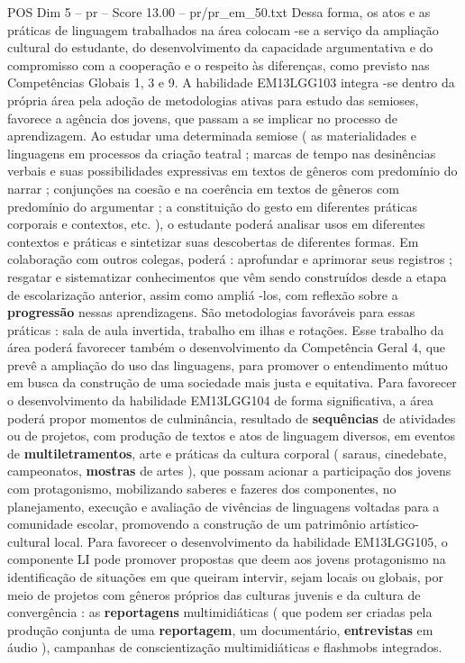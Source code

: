 \begin{textsample}{POS Dim 5 – pr – Score 13.00 – pr/pr\_em\_50.txt}
Dessa forma, os atos e as práticas de linguagem trabalhados na área colocam -se a serviço da ampliação cultural do estudante, do desenvolvimento da capacidade argumentativa e do compromisso com a cooperação e o respeito às diferenças, como previsto nas Competências Globais 1, 3 e 9.
A habilidade EM13LGG103 integra -se dentro da própria área pela adoção de metodologias ativas para estudo das semioses, favorece a agência dos jovens, que passam a se implicar no processo de aprendizagem.
Ao estudar uma determinada semiose ( as materialidades e linguagens em processos da criação teatral ; marcas de tempo nas desinências verbais e suas possibilidades expressivas em textos de gêneros com predomínio do narrar ; conjunções na coesão e na coerência em textos de gêneros com predomínio do argumentar ; a constituição do gesto em diferentes práticas corporais e contextos, etc. ), o estudante poderá analisar usos em diferentes contextos e práticas e sintetizar suas descobertas de diferentes formas.
Em colaboração com outros colegas, poderá : aprofundar e aprimorar seus registros ; resgatar e sistematizar conhecimentos que vêm sendo construídos desde a etapa de escolarização anterior, assim como ampliá -los, com reflexão sobre a \textbf{progressão} nessas aprendizagens.
São metodologias favoráveis para essas práticas : sala de aula invertida, trabalho em ilhas e rotações.
Esse trabalho da área poderá favorecer também o desenvolvimento da Competência Geral 4, que prevê a ampliação do uso das linguagens, para promover o entendimento mútuo em busca da construção de uma sociedade mais justa e equitativa.
Para favorecer o desenvolvimento da habilidade EM13LGG104 de forma significativa, a área poderá propor momentos de culminância, resultado de \textbf{sequências} de atividades ou de projetos, com produção de textos e atos de linguagem diversos, em eventos de \textbf{multiletramentos}, arte e práticas da cultura corporal ( saraus, cinedebate, campeonatos, \textbf{mostras} de artes ), que possam acionar a participação dos jovens com protagonismo, mobilizando saberes e fazeres dos componentes, no planejamento, execução e avaliação de vivências de linguagens voltadas para a comunidade escolar, promovendo a construção de um patrimônio artístico-cultural local.
Para favorecer o desenvolvimento da habilidade EM13LGG105, o componente LI pode promover propostas que deem aos jovens protagonismo na identificação de situações em que queiram intervir, sejam locais ou globais, por meio de projetos com gêneros próprios das culturas juvenis e da cultura de convergência : as \textbf{reportagens} multimidiáticas ( que podem ser criadas pela produção conjunta de uma \textbf{reportagem}, um documentário, \textbf{entrevistas} em áudio ), campanhas de conscientização multimidiáticas e flashmobs integrados.

\end{textsample}
